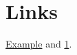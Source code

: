 \documentclass{article}
\begin{document}
\section{Links}\label{sec:links}
\href{https://example.org}{Example} and \ref{sec:links}.
\end{document}
